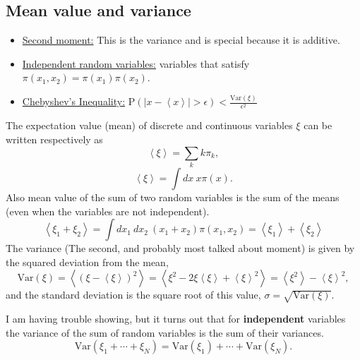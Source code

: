 \documentclass[12pt]{extarticle}
\begin{document}
\subsection{Mean value and variance}
\begin{itemize}
   \item \underline{Second moment:} This is the variance and is special because it is additive.
   \item \underline{Independent random variables:} variables that satisfy $\pi(x_1,x_2) = \pi(x_1)\pi(x_2)$.
   \item \underline{Chebyshev's Inequality:} $\mathrm{P}(\left|x-\left<x\right>\right| > \epsilon) < \frac{\mathrm{Var}(\xi)}{\epsilon^2}$
\end{itemize}
The expectation value (mean) of discrete and continuous variables $\xi$ can be written respectively as
\begin{equation}
\left<\xi\right> = \sum\limits_k k\pi_k,
\end{equation}
\begin{equation}
\left<\xi\right> = \int\limits dx~x\pi(x).
\end{equation}
Also mean value of the sum of two random variables is the sum of the means (even when the variables are not independent).
\begin{equation}
   \left<\xi_1+\xi_2\right> = \int dx_1~dx_2~(x_1+x_2)\pi(x_1,x_2) = \left<\xi_1\right> + \left<\xi_2\right>
\end{equation}
The variance (The second, and probably most talked about moment) is given by the squared deviation from the mean,
\begin{equation}
   \mathrm{Var}(\xi) = \left<(\xi-\left<\xi\right>)^2\right> = \left<\xi^2-2\xi\left<\xi\right>+\left<\xi\right>^2\right> = \left<\xi^2\right> - \left<\xi\right>^2,
\end{equation}
and the standard deviation is the square root of this value, $\sigma = \sqrt{\mathrm{Var}(\xi)}$.

I am having trouble showing, but it turns out that for \textbf{independent} variables the variance of the sum of random variables is the sum of their variances.
\begin{equation}
   \mathrm{Var}(\xi_1+\cdots+\xi_N) = \mathrm{Var}(\xi_1)+\cdots+\mathrm{Var}(\xi_N).
\end{equation}
\end{document}
